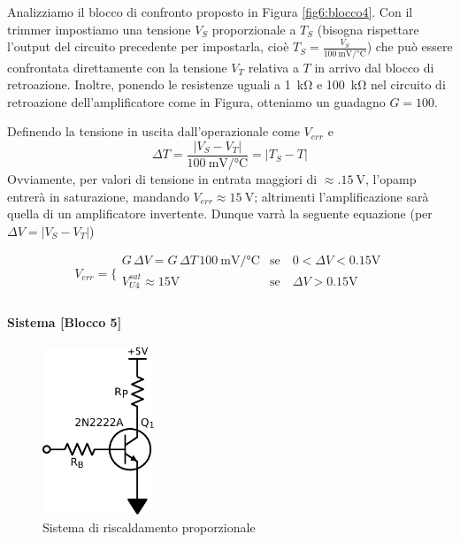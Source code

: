 Analizziamo il blocco di confronto proposto in Figura \ref{fig6:blocco4}.
Con il trimmer impostiamo una tensione $V_{S}$ proporzionale a $T_{S}$ (bisogna rispettare l'output del circuito precedente per impostarla, cioè $T_S = \frac{V_S}{\SI{100}{\milli\volt\per\celsius}}$) che può essere confrontata direttamente con la tensione $V_{T}$ relativa a $T$ in arrivo dal blocco di retroazione.
Inoltre, ponendo le resistenze uguali a \SI{1}{\kilo\ohm} e \SI{100}{\kilo\ohm} nel circuito di retroazione dell'amplificatore come in Figura, otteniamo un guadagno $G=100$.

Definendo la tensione in uscita dall'operazionale come $V_{err}$ e
$$\Delta T = \frac{|V_{S}-V_{T}|}{\SI{100}{\milli\volt}/\si{\celsius}}= | T_S - T | $$
Ovviamente, per valori di tensione in entrata maggiori di $\approx \SI{.15}{\volt}$, l'opamp entrerà in saturazione, mandando $V_{err}\approx \SI{15}{\volt}$; altrimenti l'amplificazione sarà quella di un amplificatore invertente.
Dunque varrà la seguente equazione (per $\Delta V = |V_S - V_T|$)

\begin{equation}
V_{err} = \bigg \{
\begin{array}{rl}
G \,\Delta V = G \,\Delta T \,\SI{100}{\milli\volt}/\si{\celsius}  & \mathrm{se} \quad 0<\Delta V<0.15 \si{\volt} \\
V_{U4}^{sat}\approx 15 \si{\volt} & \mathrm{se} \quad \Delta V>0.15 \si{\volt} \\
\end{array}
\label{eq6:exit_opamp}
\end{equation}

\paragraph{Sistema [Blocco 5]\newline}

\begin{figure}
\centering
\includegraphics[height=5cm]{../E06/latex/P5.pdf}
\caption{Sistema di riscaldamento proporzionale}
\label{fig6:sistema}
\end{figure}

